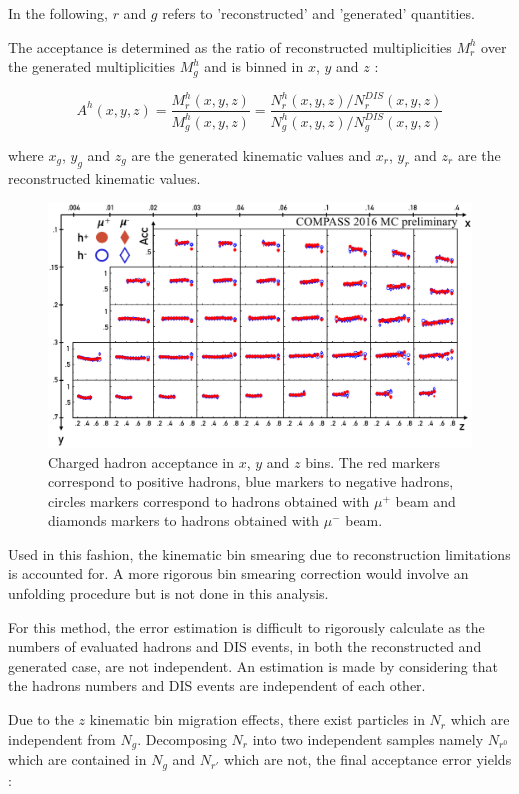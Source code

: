 \documentclass[letterpaper,12pt]{article}
\begin{document}
In the following, $r$ and $g$ refers to 'reconstructed' and 'generated' quantities.

The acceptance is determined as the ratio of reconstructed multiplicities $M^h_r$ over the generated multiplicities $M^h_g$
and is binned in $x$, $y$ and $z$ :

\begin{equation}
  A^h(x,y,z) = \frac{M^h_r(x,y,z)}{M^h_g(x,y,z)}=\frac{N^h_r(x,y,z)/N^{DIS}_r(x,y,z)}{N^h_g(x,y,z)/N^{DIS}_g(x,y,z)}
\end{equation}

where $x_g$, $y_g$ and $z_g$ are the generated kinematic values and $x_r$, $y_r$ and $z_r$ are the reconstructed kinematic
values.

\begin{figure}
	\includegraphics[scale=0.5]{./gfx/AccH.png}
	\caption{Charged hadron acceptance in $x$, $y$ and $z$ bins. The red markers correspond to positive hadrons, blue markers to negative hadrons, circles markers correspond to hadrons obtained with $\mu^+$ beam and diamonds markers to hadrons obtained with $\mu^-$ beam.}
	\label{AccH}
\end{figure}

Used in this fashion, the kinematic bin smearing due to reconstruction limitations is accounted for. A more rigorous
bin smearing correction would involve an unfolding procedure but is not done in this analysis.

For this method, the error estimation is difficult to rigorously calculate as the numbers of evaluated hadrons and DIS events,
in both the reconstructed and generated case, are not independent. An estimation is made by considering that the hadrons numbers
and DIS events are independent of each other.

Due to the $z$ kinematic bin migration effects, there exist particles in $N_r$ which are independent from $N_g$. Decomposing $N_r$
into two independent samples namely $N_{r^0}$ which are contained in $N_g$ and $N_{r'}$ which are not, the final acceptance error yields :
\end{document}

